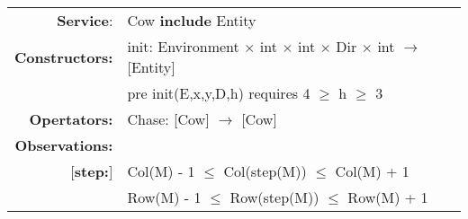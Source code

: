 \documentclass[11pt]{article}
\begin{document}
\begin{tabular}{rl}
\textbf{Service}: & \quad Cow \textbf{include} Entity\\

\textbf{Constructors:}  & 
init: Environment $\times$ int $\times$ int $\times$ Dir $\times$ int $\rightarrow$ [Entity] \\
& 
\quad pre init(E,x,y,D,h) requires 4 $\geq$ h $\geq$ 3\\
\textbf{Opertators:}  & 
Chase: [Cow] $\rightarrow$ [Cow]\\
\textbf{Observations:} \\

[\textbf{step:}] &
Col(M) - 1 $\leq$ Col(step(M)) $\leq$ Col(M) + 1 \\
&
Row(M) - 1 $\leq$ Row(step(M)) $\leq$ Row(M) + 1

\end{tabular}
\end{document}
